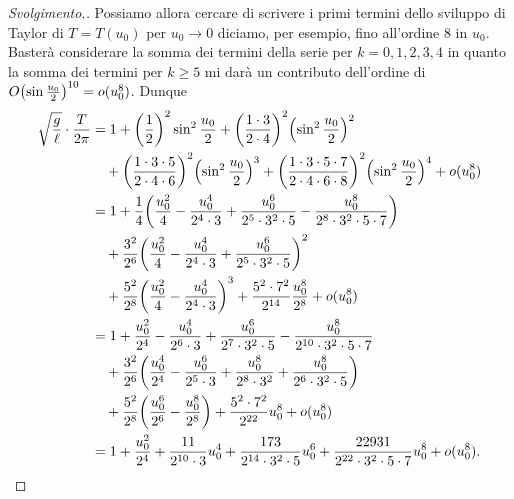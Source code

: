 \begin{proof}[Svolgimento.]
Possiamo allora cercare di scrivere i primi termini dello sviluppo di
Taylor di $T = T(u_0)$ per $u_0\to 0$ diciamo, per esempio, fino all'ordine 8
in $u_0$. Basterà considerare la somma dei termini della
serie per $k=0,1,2,3,4$ in quanto la somma dei termini per $k\ge 5$ mi darà
 un contributo dell'ordine di $O{\left( \sin \frac {u_0} 2 \right)}^{10} = o(u_0^8)$. Dunque
 \begin{align*}
 \sqrt{\frac{g}{\ell}}\cdot \frac{T}{2\pi}
 &=
 1 + \enclose{\frac 1 2}^2 \sin^2 \frac{u_0} 2
 + \enclose{\frac{1\cdot 3}{2\cdot 4}}^2\enclose{\sin^2 \frac {u_0} 2}^2 \\
 &\quad + \enclose{\frac{1\cdot 3 \cdot 5}{2\cdot 4 \cdot 6}}^2
 \enclose{\sin^2 \frac {u_0} 2}^3 + \enclose{\frac{1\cdot 3\cdot 5 \cdot 7}{2\cdot 4\cdot 6\cdot 8}}^2
 \enclose{\sin^2 \frac {u_0} 2}^4 + o(u_0^8) \\
 &=
1 + \frac 1 4 \enclose{\frac{u_0^2}{4} - \frac{u_0^4}{2^4\cdot 3} + \frac{u_0^6}{2^5\cdot 3^2\cdot 5}
- \frac{u_0^8}{2^8\cdot 3^2\cdot 5\cdot 7}} \\
&\quad + \frac{3^2}{2^6}\enclose{\frac{u_0^2}{4} - \frac{u_0^4}{2^4\cdot 3}
+ \frac{u_0^6}{2^5\cdot 3^2\cdot 5}}^2\\
&\quad + \frac{5^2}{2^8}\enclose{\frac{u_0^2}{4} - \frac{u_0^4}{2^4\cdot 3}}^3
+ \frac{5^2\cdot 7^2}{2^{14}}
\frac {u_0^8} {2^8} + o(u_0^8)\\
&=
1 + \frac{u_0^2}{2^4} - \frac{u_0^4}{2^6\cdot 3} + \frac{u_0^6}{2^7\cdot 3^2\cdot 5}
- \frac{u_0^8}{2^{10}\cdot 3^2\cdot 5\cdot 7} \\
&\quad + \frac{3^2}{2^6}\enclose{\frac{u_0^4}{2^4} - \frac{u_0^6}{2^5\cdot 3} + \frac{u_0^8}{2^8\cdot 3^2} + \frac{u_0^8}{2^6\cdot 3^2\cdot 5}}\\
&\quad + \frac{5^2}{2^8}\enclose{\frac{u_0^6}{2^6} - \frac{u_0^8}{2^8}}
+ \frac{5^2\cdot 7^2}{2^{22}}
u_0^8 + o(u_0^8)\\
%
&= 1 + \frac{u_0^2}{2^4} + \frac{11}{2^{10}\cdot 3} u_0^4
 + \frac{173}{2^{14}\cdot 3^2\cdot 5} u_0^6
 + \frac{22931}{2^{22}\cdot 3^2\cdot 5\cdot 7} u_0^8
 + o(u_0^8).\\
\end{align*}
\end{proof}

